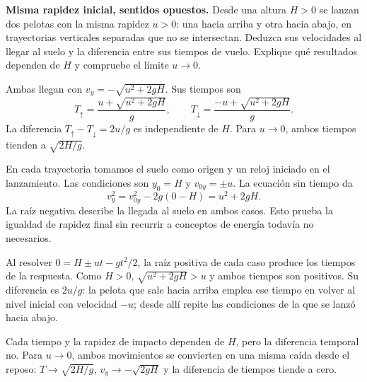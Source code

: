 \begin{ejercicio}
\textbf{Misma rapidez inicial, sentidos opuestos.} Desde una altura \(H>0\) se lanzan dos pelotas con la misma rapidez \(u>0\): una hacia arriba y otra hacia abajo, en trayectorias verticales separadas que no se intersectan. Deduzca sus velocidades al llegar al suelo y la diferencia entre sus tiempos de vuelo. Explique qué resultados dependen de \(H\) y compruebe el límite \(u\to0\).
\end{ejercicio}
\begin{respuesta}
Ambas llegan con \(v_y=-\sqrt{u^2+2gH}\). Sus tiempos son
\[ T_{\uparrow}=\frac{u+\sqrt{u^2+2gH}}{g},\qquad T_{\downarrow}=\frac{-u+\sqrt{u^2+2gH}}{g}. \]
La diferencia \(T_{\uparrow}-T_{\downarrow}=2u/g\) es independiente de \(H\). Para \(u\to0\), ambos tiempos tienden a \(\sqrt{2H/g}\).
\end{respuesta}
\begin{explicacion}
En cada trayectoria tomamos el suelo como origen y un reloj iniciado en el lanzamiento. Las condiciones son \(y_0=H\) y \(v_{0y}=\pm u\). La ecuación sin tiempo da
\[ v_y^2=v_{0y}^2-2g(0-H)=u^2+2gH. \]
La raíz negativa describe la llegada al suelo en ambos casos. Esto prueba la igualdad de rapidez final sin recurrir a conceptos de energía todavía no necesarios.

Al resolver \(0=H\pm ut-gt^2/2\), la raíz positiva de cada caso produce los tiempos de la respuesta. Como \(H>0\), \(\sqrt{u^2+2gH}>u\) y ambos tiempos son positivos. Su diferencia es \(2u/g\): la pelota que sale hacia arriba emplea ese tiempo en volver al nivel inicial con velocidad \(-u\); desde allí repite las condiciones de la que se lanzó hacia abajo.

Cada tiempo y la rapidez de impacto dependen de \(H\), pero la diferencia temporal no. Para \(u\to0\), ambos movimientos se convierten en una misma caída desde el reposo: \(T\to\sqrt{2H/g}\), \(v_y\to-\sqrt{2gH}\) y la diferencia de tiempos tiende a cero.
\end{explicacion}

